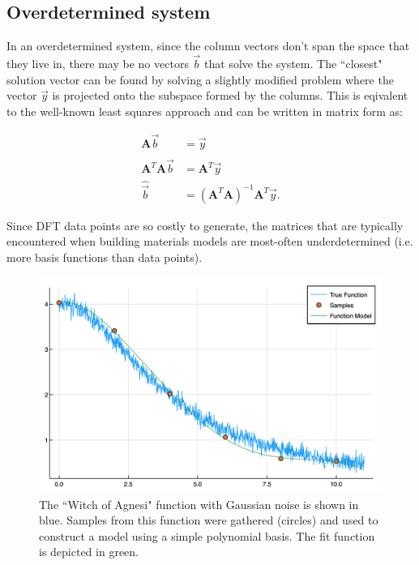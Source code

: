 \subsection{Overdetermined system}
In an overdetermined system, since the column vectors don't span the space that they live in, there may be no vectors $\vec{b}$ that solve the system.  The ``closest" solution vector can be found by solving a slightly modified problem where the vector $\vec{y}$ is projected onto the subspace formed by the columns.  This is eqivalent to the well-known least squares approach and can be written in matrix form as:

\begin{align}
\mathbf{A}\vec{b} &= \vec{y} \label{eq:Aby} \\
\mathbf{A}^T\mathbf{A}\hat{\vec{b}} &= \mathbf{A}^T\vec{y}\\
\hat{\vec{b}} &= (\mathbf{A}^T\mathbf{A})^{-1}\mathbf{A}^T\vec{y}. \nonumber %
\end{align}

\par Since DFT data points are so costly to generate, the matrices that are typically encountered when building materials models are most-often underdetermined (i.e. more basis functions than data points).


\begin{figure}%
\centering
\includegraphics[scale = 0.6]{Figures/func1True}
\caption{The ``Witch of Agnesi" function with Gaussian noise is shown in blue.  Samples from this function were gathered (circles) and used to construct a model using a simple polynomial basis.  The fit function is depicted in green.
\label{fig:func1True}} 
\end{figure}



